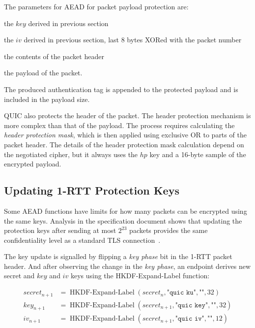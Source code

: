 The parameters for AEAD for packet payload protection are:

\begin{itemize}

     the $key$ derived in previous section

     the $iv$ derived in previous section, last 8 bytes XORed with the packet number

     the contents of the packet header

     the payload of the packet.

\end{itemize}

The produced authentication tag is appended to the protected payload and is included in the payload
size.

QUIC also protects the header of the packet. The header protection mechanism is more complex than
that of the payload. The process requires calculating the \textit{header protection mask}, which is
then applied using exclusive OR to parts of the packet header. The details of the header protection
mask calculation depend on the negotiated cipher, but it always uses the $hp$ key and a 16-byte
sample of the encrypted payload.


\subsection{Updating 1-RTT Protection Keys}\label{sec:02-key-update}

Some AEAD functions have limits for how many packets can be encrypted using the same keys. Analysis
in the specification document shows that updating the protection keys after sending at most
$2^{23}$ packets provides the same confidentiality level as a standard TLS connection~\cite{draft-ietf-quic-tls}.

The key update is signalled by flipping a \textit{key phase} bit in the 1-RTT packet header. And
after observing the change in the \textit{key phase}, an endpoint derives new secret and $key$ and
$iv$ keys using the HKDF-Expand-Label function:

\begin{equation*}
  \begin{split}
  secret_{n+1} & = \operatorname{HKDF-Expand-Label}(secret_{n}, \texttt{"quic ku"}, \texttt{""}, 32) \\
  key_{n+1} & = \operatorname{HKDF-Expand-Label}(secret_{n+1}, \texttt{"quic key"}, \texttt{""}, 32) \\
  iv_{n+1}  & = \operatorname{HKDF-Expand-Label}(secret_{n+1}, \texttt{"quic iv"}, \texttt{""}, 12)  \\
  \end{split}
\end{equation*}

